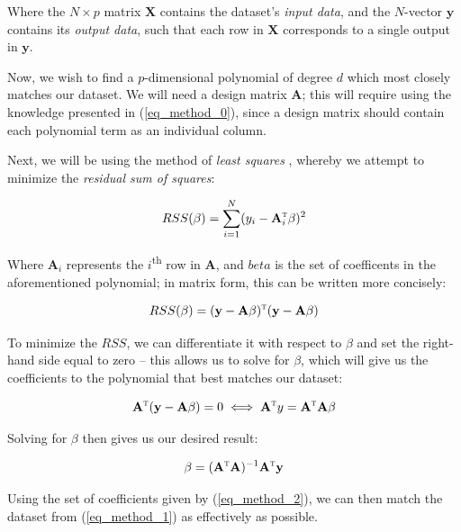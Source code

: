 \documentclass[a4paper,10pt,english]{article}
\begin{document}
Where the $N \times p$ matrix $\mathbf{X}$ contains the dataset's \textit{input data}, and the $N$-vector $\mathbf{y}$ contains its \textit{output data}, such that each row in $\mathbf{X}$ corresponds to a single output in $\mathbf{y}$.

Now, we wish to find a $p$-dimensional polynomial of degree $d$ which most closely matches our dataset. We will need a design matrix $\mathbf{A}$; this will require using the knowledge presented in (\ref{eq_method_0}), since a design matrix should contain each polynomial term as an individual column.

Next, we will be using the method of \textit{least squares} \cite{hastie_tibshirani_friedman_2013}, whereby we attempt to minimize the \textit{residual sum of squares}:

\begin{equation*}
RSS(\beta) = \sum_{i=1}^N (y_i - \mathbf{A}_i^\textsc{t} \beta)^2 
\end{equation*}

Where $\mathbf{A}_i$ represents the $i$\textsuperscript{th} row in $\mathbf{A}$, and $beta$ is the set of coefficents in the aforementioned polynomial; in matrix form, this can be written more concisely:

\begin{equation*}
RSS(\beta) = (\mathbf{y} - \mathbf{A} \beta)^\textsc{t}(\mathbf{y} - \mathbf{A} \beta)
\end{equation*}

To minimize the $RSS$, we can differentiate it with respect to $\beta$ and set the right-hand side equal to zero – this allows us to solve for $\beta$, which will give us the coefficients to the polynomial that best matches our dataset:

\begin{equation*}
\mathbf{A}^\textsc{t} (\mathbf{y} - \mathbf{A} \beta) = 0 \iff \mathbf{A}^\textsc{t} y = \mathbf{A}^\textsc{t} \mathbf{A} \beta
\end{equation*}

Solving for $\beta$ then gives us our desired result:

\begin{equation}
\label{eq_method_2}
\beta = (\mathbf{A}^\textsc{t} \mathbf{A} ) ^{-1} \mathbf{A}^\textsc{t} \mathbf{y}
\end{equation}

Using the set of coefficients given by (\ref{eq_method_2}), we can then match the dataset from (\ref{eq_method_1}) as effectively as possible.
\end{document}
